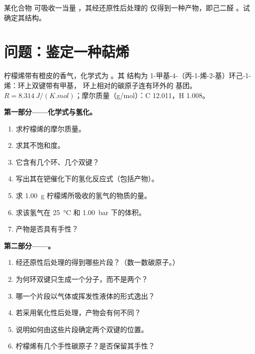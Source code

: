 \begin{exercise}[$\star\star\star$]\label{exo:b2:alkene-redox:12}
某化合物  可吸收一当量 ，其经还原性后处理的
仅得到一种产物，即己二醛 。试确定其结构。
\end{exercise}

\section{问题：鉴定一种萜烯}

\begin{problem}
\label{pb:b2:alkene-redox:1}
柠檬烯带有橙皮的香气，化学式为 。其
结构为 1-甲基-4-（丙-1-烯-2-基）环己-1-烯：环上双键带有甲基，
环上相对的碳原子连有环外的  基团。$R =
\qty{8.314}{J/(K.mol)}$；摩尔质量（\unit{g/mol}）：C 12.011，H 1.008。

\medskip
\noindent\textbf{第一部分——化学式与氢化。}
\begin{enumerate}
  \item 求柠檬烯的摩尔质量。
  \item 求其不饱和度。
  \item 它含有几个环、几个双键？
  \item 写出其在钯催化下的氢化反应式（包括产物）。
  \item 求 \qty{1.00}{g} 柠檬烯所吸收的氢气的物质的量。
  \item 求该氢气在 \qty{25}{\degreeCelsius} 和 \qty{1.00}{bar} 下的体积。
  \item 产物是否具有手性？
\end{enumerate}

\medskip
\noindent\textbf{第二部分——。}
\begin{enumerate}[resume]
  \item 经还原性后处理的得到哪些片段？（数一数碳原子。）
  \item 为何环双键只生成一个分子，而不是两个？
  \item 哪一个片段以气体或挥发性液体的形式逸出？
  \item 若采用氧化性后处理，产物会有何不同？
  \item 说明如何由这些片段确定两个双键的位置。
  \item 柠檬烯有几个手性碳原子？是否保留其手性？
\end{enumerate}


\end{problem}
